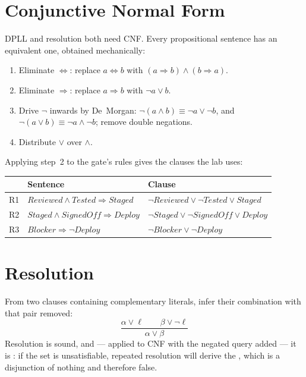 \section{Conjunctive Normal Form}

DPLL and resolution both need CNF. Every propositional sentence has an equivalent
one, obtained mechanically:

\begin{enumerate}[leftmargin=2.2em, itemsep=2pt, topsep=4pt]
  \item Eliminate $\Leftrightarrow$: replace $a \Leftrightarrow b$ with
        $(a \Rightarrow b) \wedge (b \Rightarrow a)$.
  \item Eliminate $\Rightarrow$: replace $a \Rightarrow b$ with
        $\neg a \vee b$.
  \item Drive $\neg$ inwards by De~Morgan:
        $\neg(a \wedge b) \equiv \neg a \vee \neg b$, and
        $\neg(a \vee b) \equiv \neg a \wedge \neg b$; remove double negations.
  \item Distribute $\vee$ over $\wedge$.
\end{enumerate}

Applying step~2 to the gate's rules gives the clauses the lab uses:

\smallskip
\noindent\begin{tabular}{@{}L{1.0cm}L{6.0cm}L{7.6cm}@{}}
\toprule
 & \textbf{Sentence} & \textbf{Clause} \\
\midrule
R1 & $\mathit{Reviewed} \wedge \mathit{Tested} \Rightarrow \mathit{Staged}$ &
$\neg \mathit{Reviewed} \vee \neg \mathit{Tested} \vee \mathit{Staged}$ \\
R2 & $\mathit{Staged} \wedge \mathit{SignedOff} \Rightarrow \mathit{Deploy}$ &
$\neg \mathit{Staged} \vee \neg \mathit{SignedOff} \vee \mathit{Deploy}$ \\
R3 & $\mathit{Blocker} \Rightarrow \neg \mathit{Deploy}$ &
$\neg \mathit{Blocker} \vee \neg \mathit{Deploy}$ \\
\bottomrule
\end{tabular}

\section{Resolution}

\begin{definitionbox}
From two clauses containing complementary literals, infer their combination with
that pair removed:
\[
  \frac{\alpha \vee \ell \qquad \beta \vee \neg\ell}
       {\alpha \vee \beta}
\]
Resolution is sound, and --- applied to CNF with the negated query added --- it is
: if the set is unsatisfiable, repeated resolution will
derive the , which is a disjunction of nothing and therefore
false.
\end{definitionbox}

